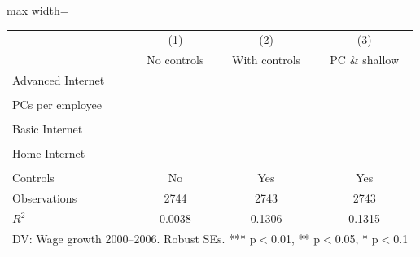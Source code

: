 \begin{adjustbox}{max width=\textwidth}
\begin{tabular}{lccc}
\toprule
 & (1) & (2) & (3) \\
 & No controls & With controls & PC \& shallow \\
\midrule
Advanced Internet &  &  &  \\
 &  &  &  \\[0.3em]
PCs per employee &  &  &  \\
 &  &  &  \\[0.3em]
Basic Internet &  &  &  \\
 &  &  &  \\[0.3em]
Home Internet &  &  &  \\
 &  &  &  \\[0.3em]
\midrule
Controls & No & Yes & Yes \\
Observations & 2744 & 2743 & 2743 \\
$R^2$ & 0.0038 & 0.1306 & 0.1315 \\
\bottomrule
\multicolumn{4}{l}{\footnotesize DV: Wage growth 2000--2006. Robust SEs. *** p$<$0.01, ** p$<$0.05, * p$<$0.1} \\
\end{tabular}
\end{adjustbox}
